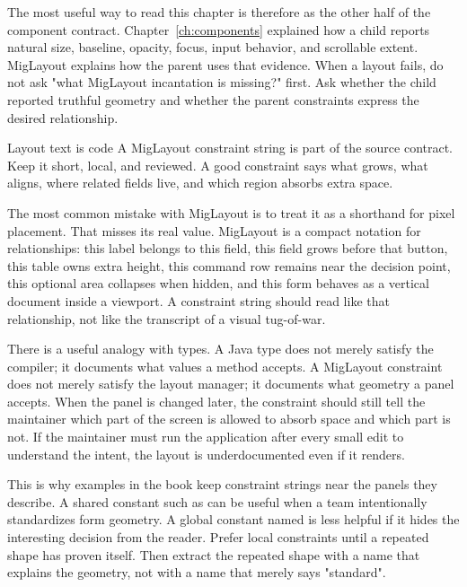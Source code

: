 The most useful way to read this chapter is therefore as the other half of the
component contract. Chapter~\ref{ch:components} explained how a child reports
natural size, baseline, opacity, focus, input behavior, and scrollable extent.
MigLayout explains how the parent uses that evidence. When a layout fails, do
not ask "what MigLayout incantation is missing?" first. Ask whether the child
reported truthful geometry and whether the parent constraints express the
desired relationship.

\begin{principlebox}{Layout text is code}
A MigLayout constraint string is part of the source contract. Keep it short, local, and reviewed. A good constraint says what grows, what aligns, where related fields live, and which region absorbs extra space.
\end{principlebox}

The most common mistake with MigLayout is to treat it as a shorthand for pixel
placement. That misses its real value. MigLayout is a compact notation for
relationships: this label belongs to this field, this field grows before that
button, this table owns extra height, this command row remains near the
decision point, this optional area collapses when hidden, and this form behaves
as a vertical document inside a viewport. A constraint string should read like
that relationship, not like the transcript of a visual tug-of-war.

There is a useful analogy with types. A Java type does not merely satisfy the
compiler; it documents what values a method accepts. A MigLayout constraint does
not merely satisfy the layout manager; it documents what geometry a panel
accepts. When the panel is changed later, the constraint should still tell the
maintainer which part of the screen is allowed to absorb space and which part is
not. If the maintainer must run the application after every small edit to
understand the intent, the layout is underdocumented even if it renders.

This is why examples in the book keep constraint strings near the panels they
describe. A shared constant such as  can be useful when a
team intentionally standardizes form geometry. A global constant named
 is less helpful if it hides the interesting decision from
the reader. Prefer local constraints until a repeated shape has proven itself.
Then extract the repeated shape with a name that explains the geometry, not with
a name that merely says "standard".

